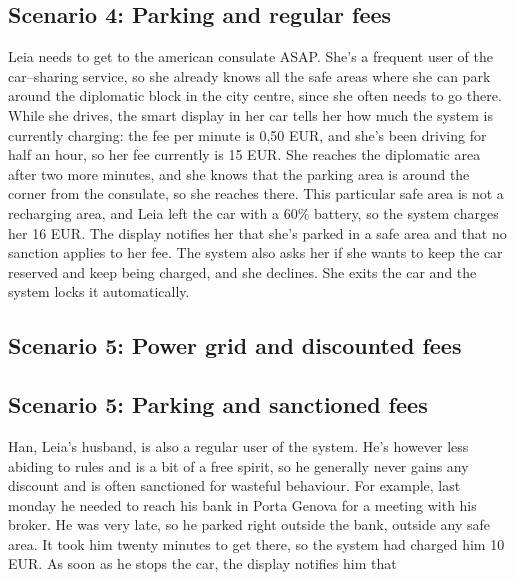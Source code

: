 \subsection{Scenario 4: Parking and regular fees}
	Leia needs to get to the american consulate ASAP. She's a frequent user of the car–sharing service, so she already knows all the safe areas where she can park around the diplomatic block in the city centre, since she often needs to go there. While she drives, the smart display in her car tells her how much the system is currently charging: the fee per minute is 0,50 EUR, and she's been driving for half an hour, so her fee currently is 15 EUR. She reaches the diplomatic area after two more minutes, and she knows that the parking area is around the corner from the consulate, so she reaches there. This particular safe area is not a recharging area, and Leia left the car with a 60\% battery, so the system charges her 16 EUR. The display notifies her that she's parked in a safe area and that no sanction applies to her fee. The system also asks her if she wants to keep the car reserved and keep being charged, and she declines. She exits the car and the system locks it automatically. 
	
\subsection{Scenario 5: Power grid and discounted fees}
	
\subsection{Scenario 5: Parking and sanctioned fees}
	Han, Leia's husband, is also a regular user of the system. He's however less abiding to rules and is a bit of a free spirit, so he generally never gains any discount and is often sanctioned for wasteful behaviour. For example, last monday he needed to reach his bank in Porta Genova for a meeting with his broker. He was very late, so he parked right outside the bank, outside any safe area. It took him twenty minutes to get there, so the system had charged him 10 EUR. As soon as he stops the car, the display notifies him that %